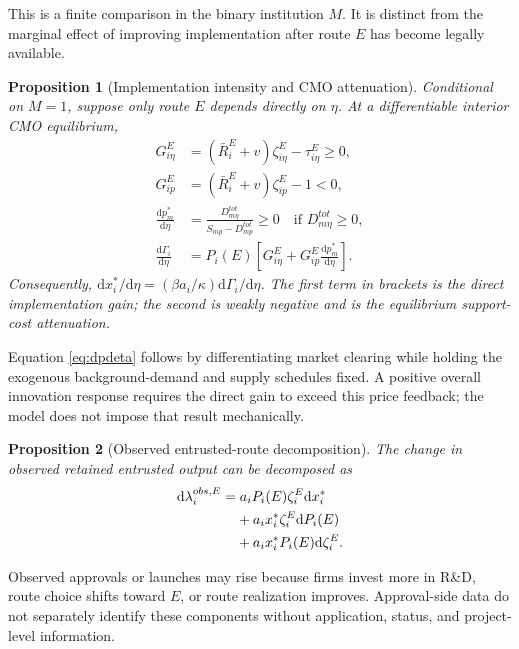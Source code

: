 \documentclass[12pt]{article}
\newtheorem{proposition}{Proposition}
\newcommand{\1}{\mathbf{1}}
\newcommand{\dd}{\mathrm{d}}
\begin{document}
\noindent This is a finite comparison in the binary institution $M$. It is distinct from the marginal effect of improving implementation after route $E$ has become legally available.

\begin{proposition}[Implementation intensity and CMO attenuation]
\label{prop:cmo_attenuation}
Conditional on $M=1$, suppose only route $E$ depends directly on $\eta$. At a differentiable interior CMO equilibrium,
\begin{align}
    G_{i\eta}^E
    &=(\bar R_i^E+v)\zeta_{i\eta}^E-\tau_{i\eta}^E\ge0,
    \label{eq:GE_eta}\\
    G_{ip}^E
    &=(\bar R_i^E+v)\zeta_{ip}^E-1<0,
    \label{eq:GE_p}\\
    \frac{\dd p_m^*}{\dd\eta}
    &=\frac{D_{m\eta}^{tot}}{S_{mp}-D_{mp}^{tot}}\ge0
    \quad\text{if }D_{m\eta}^{tot}\ge0,
    \label{eq:dpdeta}\\
    \frac{\dd\Gamma_i}{\dd\eta}
    &=P_i(E)\left[
      G_{i\eta}^E+G_{ip}^E\frac{\dd p_m^*}{\dd\eta}
      \right].
    \label{eq:dGammadeta}
\end{align}
Consequently, $\dd x_i^*/\dd\eta=(\beta a_i/\kappa)\dd\Gamma_i/\dd\eta$. The first term in brackets is the direct implementation gain; the second is weakly negative and is the equilibrium support-cost attenuation.
\end{proposition}

\noindent Equation \eqref{eq:dpdeta} follows by differentiating market clearing while holding the exogenous background-demand and supply schedules fixed. A positive overall innovation response requires the direct gain to exceed this price feedback; the model does not impose that result mechanically.

\begin{proposition}[Observed entrusted-route decomposition]
\label{prop:obs_decomposition}
The change in observed retained entrusted output can be decomposed as
\begin{align}
    \dd \lambda_i^{obs,E}
    =&\;
    a_i P_i(E)\zeta_i^E\dd x_i^* \notag\\
    &+
    a_i x_i^*\zeta_i^E\dd P_i(E) \notag\\
    &+
    a_i x_i^*P_i(E)\dd\zeta_i^E.
    \label{eq:obs_decomposition}
\end{align}
\end{proposition}

\noindent Observed approvals or launches may rise because firms invest more in R\&D, route choice shifts toward $E$, or route realization improves. Approval-side data do not separately identify these components without application, status, and project-level information.
\end{document}
